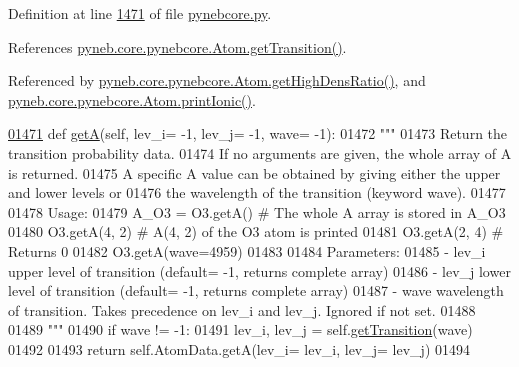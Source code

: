 Definition at line \hyperlink{pynebcore_8py_source_l01471}{1471} of file \hyperlink{pynebcore_8py_source}{pynebcore.\+py}.



References \hyperlink{pynebcore_8py_source_l01406}{pyneb.\+core.\+pynebcore.\+Atom.\+get\+Transition()}.



Referenced by \hyperlink{pynebcore_8py_source_l01653}{pyneb.\+core.\+pynebcore.\+Atom.\+get\+High\+Dens\+Ratio()}, and \hyperlink{pynebcore_8py_source_l02167}{pyneb.\+core.\+pynebcore.\+Atom.\+print\+Ionic()}.


\begin{DoxyCode}
\hypertarget{classpyneb_1_1core_1_1pynebcore_1_1_atom_l01471}{}\hyperlink{classpyneb_1_1core_1_1pynebcore_1_1_atom_a4b3ea50d7c77fdf645c2cea97243c17e}{01471}     \textcolor{keyword}{def }\hyperlink{classpyneb_1_1core_1_1pynebcore_1_1_atom_a4b3ea50d7c77fdf645c2cea97243c17e}{getA}(self, lev\_i= -1, lev\_j= -1, wave= -1):
01472         \textcolor{stringliteral}{"""}
01473 \textcolor{stringliteral}{        Return the transition probability data. }
01474 \textcolor{stringliteral}{        If no arguments are given, the whole array of A is returned.}
01475 \textcolor{stringliteral}{        A specific A value can be obtained by giving either the upper and lower levels or }
01476 \textcolor{stringliteral}{            the wavelength of the transition (keyword wave).}
01477 \textcolor{stringliteral}{            }
01478 \textcolor{stringliteral}{        Usage:}
01479 \textcolor{stringliteral}{            A\_O3 = O3.getA()          # The whole A array is stored in A\_O3}
01480 \textcolor{stringliteral}{            O3.getA(4, 2)      # A(4, 2) of the O3 atom is printed}
01481 \textcolor{stringliteral}{            O3.getA(2, 4)      # Returns 0}
01482 \textcolor{stringliteral}{            O3.getA(wave=4959)      }
01483 \textcolor{stringliteral}{}
01484 \textcolor{stringliteral}{        Parameters:}
01485 \textcolor{stringliteral}{            - lev\_i  upper level of transition (default= -1, returns complete array)}
01486 \textcolor{stringliteral}{            - lev\_j  lower level of transition (default= -1, returns complete array)}
01487 \textcolor{stringliteral}{            - wave   wavelength of transition. Takes precedence on lev\_i and lev\_j. Ignored if not set.}
01488 \textcolor{stringliteral}{            }
01489 \textcolor{stringliteral}{        """}
01490         \textcolor{keywordflow}{if} wave != -1:
01491             lev\_i, lev\_j = self.\hyperlink{classpyneb_1_1core_1_1pynebcore_1_1_atom_a7c9f17a3d9e841267add92377d9d1ede}{getTransition}(wave)
01492         
01493         \textcolor{keywordflow}{return} self.AtomData.getA(lev\_i= lev\_i, lev\_j= lev\_j)
01494         
\end{DoxyCode}
\hypertarget{classpyneb_1_1core_1_1pynebcore_1_1_atom_a34711ea989baf7bde752a68255d32098}{}
